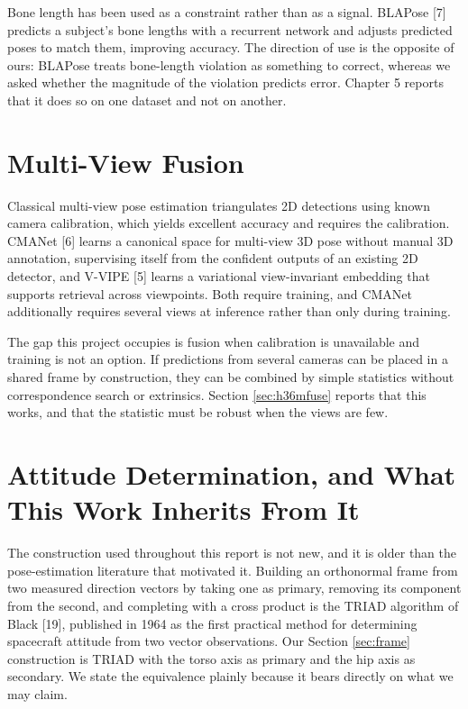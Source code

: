 \documentclass[12pt,a4paper]{report}
\begin{document}
Bone length has been used as a constraint rather than as a signal. BLAPose [7] predicts a subject's bone lengths with a recurrent network and adjusts predicted poses to match them, improving accuracy. The direction of use is the opposite of ours: BLAPose treats bone-length violation as something to correct, whereas we asked whether the magnitude of the violation predicts error. Chapter 5 reports that it does so on one dataset and not on another.

\section{Multi-View Fusion}

Classical multi-view pose estimation triangulates 2D detections using known camera calibration, which yields excellent accuracy and requires the calibration. CMANet [6] learns a canonical space for multi-view 3D pose without manual 3D annotation, supervising itself from the confident outputs of an existing 2D detector, and V-VIPE [5] learns a variational view-invariant embedding that supports retrieval across viewpoints. Both require training, and CMANet additionally requires several views at inference rather than only during training.

The gap this project occupies is fusion when calibration is unavailable and training is not an option. If predictions from several cameras can be placed in a shared frame by construction, they can be combined by simple statistics without correspondence search or extrinsics. Section \ref{sec:h36mfuse} reports that this works, and that the statistic must be robust when the views are few.

\section{Attitude Determination, and What This Work Inherits From It}
\label{sec:triad}

The construction used throughout this report is not new, and it is older than the pose-estimation literature that motivated it. Building an orthonormal frame from two measured direction vectors by taking one as primary, removing its component from the second, and completing with a cross product is the TRIAD algorithm of Black [19], published in 1964 as the first practical method for determining spacecraft attitude from two vector observations. Our Section \ref{sec:frame} construction is TRIAD with the torso axis as primary and the hip axis as secondary. We state the equivalence plainly because it bears directly on what we may claim.
\end{document}
